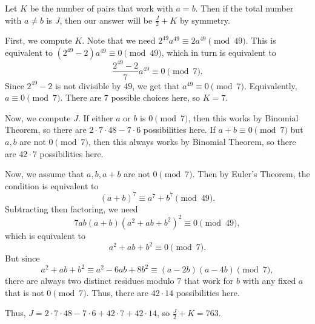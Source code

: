 Let $K$ be the number of pairs that work with $a=b$. Then if the total number with $a\neq b$ is $J$, then our answer will be $\frac{J}{2}+K$ by symmetry.

First, we compute $K$. Note that we need $2^{49}a^{49}\equiv2a^{49}\pmod{49}$. This is equivalent to $\left(2^{49}-2\right)a^{49}\equiv0\pmod{49}$, which in turn is equivalent to \[\frac{2^{49}-2}{7}a^{49}\equiv0\pmod7.\] Since $2^{49}-2$ is not divisible by $49$, we get that $a^{49}\equiv0\pmod7$. Equivalently, $a\equiv0\pmod7$. There are $7$ possible choices here, so $K=7$.

Now, we compute $J$. If either $a$ or $b$ is $0\pmod7$, then this works by Binomial Theorem, so there are $2\cdot7\cdot48-7\cdot6$ possibilities here. If $a+b\equiv0\pmod7$ but $a,b$ are not $0\pmod7$, then this always works by Binomial Theorem, so there are $42\cdot7$ possibilities here.

Now, we assume that $a,b,a+b$ are not $0\pmod7$. Then by Euler's Theorem, the condition is equivalent to \[\left(a+b\right)^7\equiv a^7+b^7\pmod{49}.\] Subtracting then factoring, we need \[7ab\left(a+b\right)\left(a^2+ab+b^2\right)^2\equiv0\pmod{49},\] which is equivalent to \[a^2+ab+b^2\equiv0\pmod7.\] But since \[a^2+ab+b^2\equiv a^2-6ab+8b^2\equiv\left(a-2b\right)\left(a-4b\right)\pmod7,\] there are always two distinct residues modulo $7$ that work for $b$ with any fixed $a$ that is not $0\pmod7$. Thus, there are $42\cdot14$ possibilities here.

Thus, $J=2\cdot7\cdot48-7\cdot6+42\cdot7+42\cdot14$, so $\frac{J}{2}+K=\boxed{763}$.